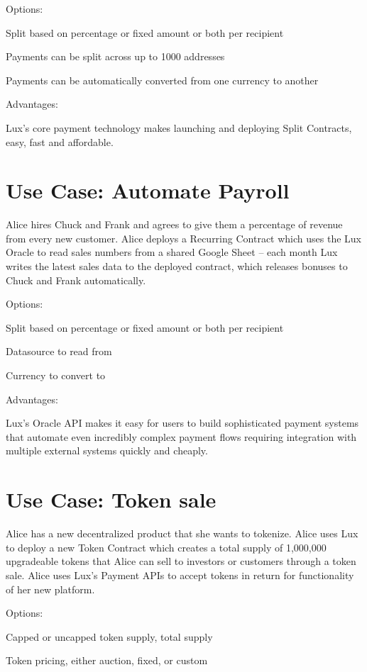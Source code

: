 \documentclass[11pt]{article}
\begin{document}
Options:


Split based on percentage or fixed amount or both per recipient


Payments can be split across up to 1000 addresses


Payments can be automatically converted from one currency to another


Advantages:


Lux's core payment technology makes launching and deploying Split Contracts, easy, fast and affordable.


\section{Use Case: Automate Payroll}

Alice hires Chuck and Frank and agrees to give them a percentage of revenue from every new customer. Alice deploys a Recurring Contract which uses the Lux Oracle to read sales numbers from a shared Google Sheet -- each month Lux writes the latest sales data to the deployed contract, which releases bonuses to Chuck and Frank automatically.


Options:


Split based on percentage or fixed amount or both per recipient


Datasource to read from


Currency to convert to


Advantages:


Lux's Oracle API makes it easy for users to build sophisticated payment systems that automate even incredibly complex payment flows requiring integration with multiple external systems quickly and cheaply.


\section{Use Case: Token sale}

Alice has a new decentralized product that she wants to tokenize. Alice uses Lux to deploy a new Token Contract which creates a total supply of 1,000,000 upgradeable tokens that Alice can sell to investors or customers through a token sale. Alice uses Lux's Payment APIs to accept tokens in return for functionality of her new platform.


Options:


Capped or uncapped token supply, total supply


Token pricing, either auction, fixed, or custom
\end{document}
